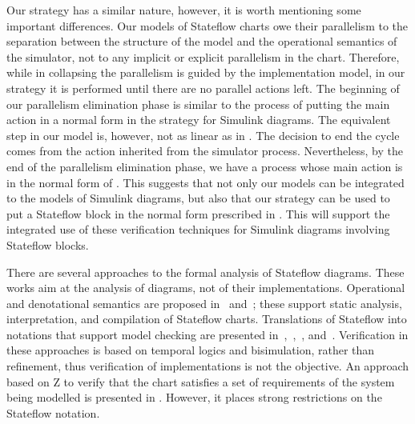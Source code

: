 \documentclass[submission]{eptcs}
\begin{document}
Our strategy has a similar nature, however, it is worth mentioning some important differences. Our models
of Stateflow charts owe their parallelism to the separation between the structure of the model and the operational semantics of the simulator, not
to any implicit or explicit parallelism in the chart. Therefore, while in \cite{Cavalcanti2011} collapsing the parallelism
is guided by the implementation model, in our strategy it is performed until there are no parallel actions left. The
beginning of our parallelism elimination phase is similar to the process of putting the main action in a normal form
in the strategy for Simulink diagrams. The equivalent step in our model is, however, not as linear as in \cite{Cavalcanti2011}.
The decision to end the cycle comes from the action inherited from the simulator process. Nevertheless, by the end of
the parallelism elimination phase, we have a process whose main action is in the normal form of \cite{Cavalcanti2011}.
This suggests that not only our models can be integrated to the models of Simulink diagrams, but also that our strategy can be
used to put a Stateflow block in the normal form prescribed in \cite{Cavalcanti2011}. This will support the integrated
use of these verification techniques for Simulink diagrams involving Stateflow blocks.

There are several approaches to the formal analysis of Stateflow
diagrams. These works aim at the analysis of diagrams, not of their
implementations. Operational and denotational semantics are proposed
in~\cite{Hamon2004} and~\cite{Hamon2005};
these support static analysis, interpretation, and compilation of
Stateflow charts. Translations of Stateflow into notations that
support model checking are presented in~\cite{Banphawatthanarak2000},~\cite{Tiwari2002},~\cite{Scaife2004}, and~\cite{Chen2010}. Verification in these approaches is
based on temporal logics and bisimulation, rather than refinement,
thus verification of implementations is not the objective.
An approach based on Z to verify that
the chart satisfies a set of requirements of the system being
modelled is presented in \cite{Toyn2005}. However, it places strong restrictions on the Stateflow
notation.
\end{document}
